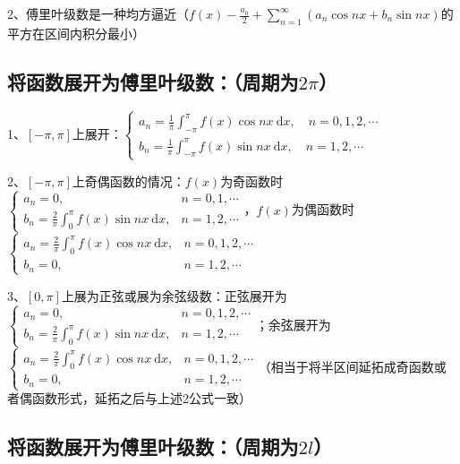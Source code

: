 2、傅里叶级数是一种均方逼近（$ f(x) - \frac{a_{0}}{2}+\sum_{n=1}^{\infty}\left(a_{n} \cos n x+b_{n} \sin n x\right) $的平方在区间内积分最小）



\subsection{将函数展开为傅里叶级数：（周期为$ 2\pi $）}

1、$ [-\pi, \pi] $上展开：$ \left\{\begin{array}{l} a_{n}=\frac{1}{\pi} \int_{-\pi}^{\pi} f(x) \cos n x \mathrm{~d} x, \quad n=0,1,2, \cdots \\ b_{n}=\frac{1}{\pi} \int_{-\pi}^{\pi} f(x) \sin n x \mathrm{~d} x, \quad n=1,2, \cdots \end{array}\right. $

2、$ [-\pi, \pi] $上奇偶函数的情况：$ f(x) $为奇函数时$ \begin{cases}a_{n}=0, & n=0,1, \cdots \\ b_{n}=\frac{2}{\pi} \int_{0}^{\pi} f(x) \sin n x \mathrm{~d} x, & n=1,2, \cdots\end{cases} $，$ f(x) $为偶函数时$ \begin{cases}a_{n}=\frac{2}{\pi} \int_{0}^{\pi} f(x) \cos n x \mathrm{~d} x, & n=0,1,2, \cdots \\ b_{n}=0, & n=1,2, \cdots\end{cases} $

3、$ [0, \pi] $上展为正弦或展为余弦级数：正弦展开为$ \begin{cases}a_{n}=0, & n=0,1,2, \cdots \\ b_{n}=\frac{2}{\pi} \int_{0}^{\pi} f(x) \sin n x \mathrm{~d} x, & n=1,2, \cdots\end{cases} $；余弦展开为$ \begin{cases}a_{n}=\frac{2}{\pi} \int_{0}^{\pi} f(x) \cos n x \mathrm{~d} x, & n=0,1,2, \cdots \\ b_{n}=0, & n=1,2, \cdots\end{cases} $（相当于将半区间延拓成奇函数或者偶函数形式，延拓之后与上述2公式一致）



\subsection{将函数展开为傅里叶级数：（周期为$ 2l $）}

